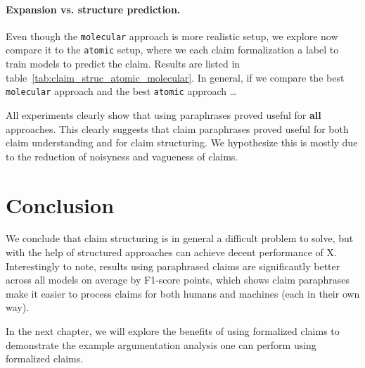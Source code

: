 \paragraph{Expansion vs. structure prediction. } Even though the
\texttt{molecular} approach is more realistic setup, we explore now compare it
to the \texttt{atomic} setup, where we each claim formalization a label to 
train models to predict the claim. 
Results are listed in table~\ref{tab:claim_struc_atomic_molecular}.
In general, if we compare the best \texttt{molecular} approach and
the best \texttt{atomic} approach \dots

All experiments clearly show that using paraphrases proved useful for
\textbf{all} approaches. This clearly suggests that claim paraphrases
proved useful for both claim understanding and for claim structuring. 
We hypothesize this is mostly due to the reduction of noisyness and 
vagueness of claims. 


\section{Conclusion}
\label{sec:claim_struc_conclusion}

We conclude that claim structuring is in general a difficult problem to solve, 
but with the help of structured approaches can achieve decent performance 
of X.
Interestingly to note, results using paraphrased claims are significantly better across all 
models on average by F1-score points, which shows claim paraphrases make it
easier to process claims for both humans and machines (each in their own way). 

In the next chapter, we will explore the benefits of using formalized claims to
demonstrate the example argumentation analysis one can perform using formalized
claims. 

